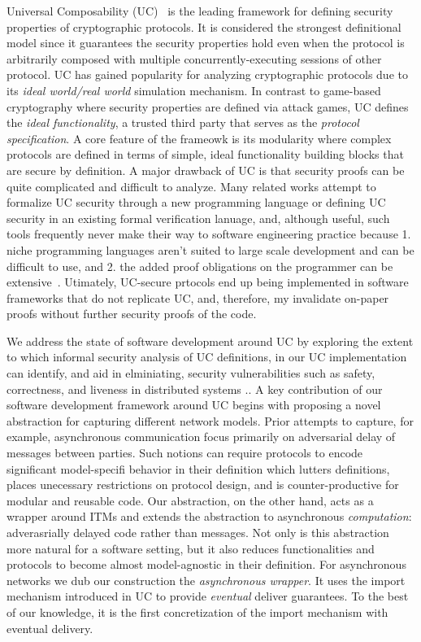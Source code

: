 Universal Composability (UC)~\cite{canettiUC} is the leading framework for defining security properties of cryptographic protocols.
It is considered the strongest definitional model since it guarantees the security properties hold even when the protocol is arbitrarily composed with
multiple concurrently-executing sessions of other protocol.
UC has gained popularity for analyzing cryptographic protocols due to its \emph{ideal world/real world} simulation mechanism.
In contrast to game-based cryptography where security properties are defined via attack games,
UC defines the \emph{ideal functionality}, a trusted third party that serves as the \emph{protocol specification}.
A core feature of the frameowk is its modularity where complex protocols are defined in terms of simple, ideal functionality building blocks that are secure by definition. 
A major drawback of UC is that security proofs can be quite complicated and difficult to analyze. 
Many related works \cite{ilc, easyuc, ipdl, etc} attempt to formalize UC security through a new programming language or defining UC security in an existing formal verification lanuage, and,  
although useful, such tools frequently never make their way to software engineering practice because 1. niche programming languages aren't suited to large scale development and can be difficult to use, and 2. the added proof obligations on the programmer can be extensive~\cite{ironfleet}.
Utimately, UC-secure prtocols end up being implemented in software frameworks that do not replicate UC, and, therefore, my invalidate on-paper proofs without further security proofs of the code.

We address the state of software development around UC by exploring the extent to which informal security analysis of UC definitions, in our UC implementation can identify, and aid in elminiating, security vulnerabilities such as safety, correctness, and liveness in distributed systems ..  
A key contribution of our software development framework around UC begins with proposing a novel abstraction for capturing different network models.
Prior attempts to capture, for example, asynchronous communication focus primarily on adversarial delay of messages between parties. 
Such notions can require protocols to encode significant model-specifi behavior in their definition which lutters definitions, places unecessary restrictions on protocol design, and is counter-productive for modular and reusable code. 
Our abstraction, on the other hand, acts as a wrapper around ITMs and extends the abstraction to asynchronous \emph{computation}: adverasrially delayed code rather than messages.  
Not only is this abstraction more natural for a software setting, but it also reduces functionalities and protocols to become almost model-agnostic in their definition. 
For asynchronous networks we dub our construction the \emph{asynchronous wrapper}. 
It uses the import mechanism introduced in UC to provide \emph{eventual} deliver guarantees.
To the best of our knowledge, it is the first concretization of the import mechanism with eventual delivery. 


